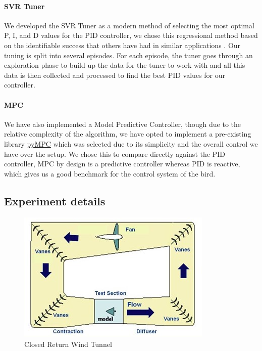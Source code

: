     \paragraph{SVR Tuner} We developed the SVR Tuner as a modern method
    of selecting the most optimal P, I, and D values for the PID controller,
    we chose this regressional method based on the identifiable success that
    others have had in similar applications \cite{12}. Our tuning is split into
    several episodes. For each episode, the tuner goes through an exploration
    phase to build up the data for the tuner to work with and all this data
    is then collected and processed to find the best PID values for our controller.

    \paragraph{MPC} We have also implemented a Model Predictive Controller, though
    due to the relative complexity of the algorithm, we have opted to implement a
    pre-existing library \href{https://github.com/forgi86/pyMPC}{pyMPC} which was selected due to its simplicity and the 
    overall control we have over the setup. We chose this to compare directly
    against the PID controller, MPC by design is a predictive controller
    whereas PID is reactive, which gives us a good benchmark for the control
    system of the bird.

    \clearpage
    \subsection{Experiment details}
    \setlength{\intextsep}{0pt}
    \begin{figure}
        \includegraphics[width=\textwidth/2]{./img/Fig2_wind_tunnel_design.jpg}
        \caption{\label{fig:figure 2} Closed Return Wind Tunnel \cite{11}}
    \end{figure}
